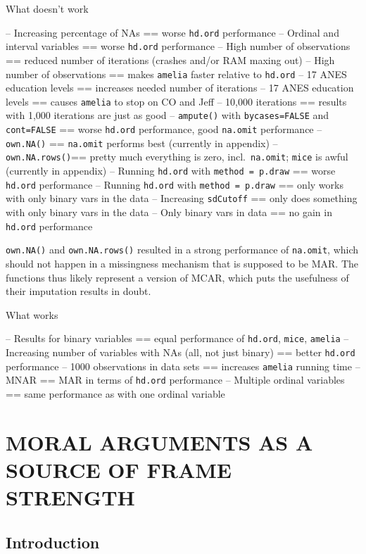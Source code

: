 \documentclass[12pt,econ]{sources/authesis}
\begin{document}
What doesn't work

-- Increasing percentage of NAs == worse \texttt{hd.ord} performance
-- Ordinal and interval variables == worse \texttt{hd.ord} performance
-- High number of observations == reduced number of iterations (crashes and/or RAM maxing out)
-- High number of observations == makes \texttt{amelia} faster relative to \texttt{hd.ord}
-- 17 ANES education levels == increases needed number of iterations
-- 17 ANES education levels == causes \texttt{amelia} to stop on CO and Jeff
-- 10,000 iterations == results with 1,000 iterations are just as good
-- \texttt{ampute()} with \texttt{bycases=FALSE} and \texttt{cont=FALSE} == worse \texttt{hd.ord} performance, good \texttt{na.omit} performance
-- \texttt{own.NA()} == \texttt{na.omit} performs best (currently in appendix)
-- \texttt{own.NA.rows()}== pretty much everything is zero, incl.~\texttt{na.omit}; \texttt{mice} is awful (currently in appendix)
-- Running \texttt{hd.ord} with \texttt{method\ =\ p.draw} == worse \texttt{hd.ord} performance
-- Running \texttt{hd.ord} with \texttt{method\ =\ p.draw} == only works with only binary vars in the data
-- Increasing \texttt{sdCutoff} == only does something with only binary vars in the data
-- Only binary vars in data == no gain in \texttt{hd.ord} performance

\texttt{own.NA()} and \texttt{own.NA.rows()} resulted in a strong performance of \texttt{na.omit}, which should not happen in a missingness mechanism that is supposed to be MAR. The functions thus likely represent a version of MCAR, which puts the usefulness of their imputation results in doubt.

What works

-- Results for binary variables == equal performance of \texttt{hd.ord}, \texttt{mice}, \texttt{amelia}
-- Increasing number of variables with NAs (all, not just binary) == better \texttt{hd.ord} performance
-- 1000 observations in data sets == increases \texttt{amelia} running time
-- MNAR == MAR in terms of \texttt{hd.ord} performance
-- Multiple ordinal variables == same performance as with one ordinal variable

\hypertarget{framing}{%
\chapter{MORAL ARGUMENTS AS A SOURCE OF FRAME STRENGTH}\label{framing}}

\hypertarget{framing-intro}{%
\section{Introduction}\label{framing-intro}}
\end{document}
